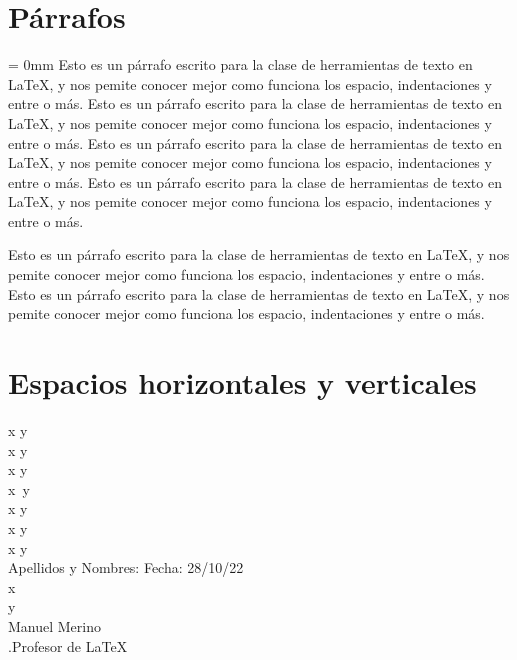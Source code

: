 \documentclass[a4paper, 11pt]{article}
\begin{document}
    \section{Párrafos}
    \par \parindent = 0mm
    Esto es un párrafo escrito para la clase de herramientas de texto en \LaTeX, y nos pemite conocer mejor como funciona los espacio, indentaciones y entre o más. Esto es un párrafo escrito para la clase de herramientas de texto en \LaTeX, y nos pemite conocer mejor como funciona los espacio, indentaciones y entre o más. Esto es un párrafo escrito para la clase de herramientas de texto en \LaTeX, y nos pemite conocer mejor como funciona los espacio, indentaciones y entre o más. Esto es un párrafo escrito para la clase de herramientas de texto en \LaTeX, y nos pemite conocer mejor como funciona los espacio, indentaciones y entre o más.\\
    
    \par
    Esto es un párrafo escrito para la clase de herramientas de texto en \LaTeX, y nos pemite conocer mejor como funciona los espacio, indentaciones y entre o más.
    Esto es un párrafo escrito para la clase de herramientas de texto en \LaTeX, y nos pemite conocer mejor como funciona los espacio, indentaciones y entre o más.
    
    
    
    \section{Espacios horizontales y verticales}
        
        \noindent
        x \quad y\\
        x \qquad y\\
        x y\\
        x \,y\\
        x \:y\\
        x \;y\\
        x \hspace{4cm} y\\
        Apellidos y Nombres: \hfill Fecha: 28/10/22\\
        
        
        x\\
        
        \vspace{1cm}
        y\\
        
        
        \vfill \hfill Manuel Merino\\
        .\hfill Profesor de \LaTeX
        
\end{document}

